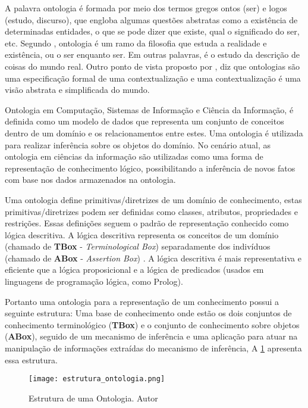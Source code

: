A palavra ontologia é formada por meio dos termos gregos ontos (ser) e logos (estudo, discurso), que engloba algumas questões abstratas como a existência de determinadas entidades, o que se pode dizer que existe, qual o significado do ser, etc. Segundo \citet{wolff1962philosophia}, ontologia é um ramo da filosofia que estuda a realidade e existência, ou o ser enquanto ser. Em outras palavras, é o estudo da descrição de coisas do mundo real. Outro ponto de vista proposto por \citet{gruber1993ontology}, diz que ontologias são uma especificação formal de uma contextualização e uma contextualização é uma visão abstrata e simplificada do mundo.

Ontologia em Computação, Sistemas de Informação e Ciência da Informação, é definida como um modelo de dados que representa um conjunto de conceitos dentro de um domínio e os relacionamentos entre estes. Uma ontologia é utilizada para realizar inferência sobre os objetos do domínio. No cenário atual, as ontologia em ciências da informação são utilizadas como uma forma de representação de conhecimento lógico, possibilitando a inferência de novos fatos com base nos dados armazenados na ontologia.

Uma ontologia define primitivas/diretrizes de um domínio de conhecimento, estas primitivas/diretrizes podem ser definidas como classes, atributos, propriedades e restrições. Essas definições seguem o padrão de representação conhecido como lógica descritiva. A lógica descritiva representa os conceitos de um domínio (chamado de \textbf{TBox} - \textit{Terminological Box}) separadamente dos indivíduos (chamado de \textbf{ABox} - \textit{Assertion Box}) \cite{calvanese2005dl}. A lógica descritiva é mais representativa e eficiente que a lógica proposicional e a lógica de predicados (usados em linguagens de programação lógica, como Prolog).

Portanto uma ontologia para a representação de um conhecimento possui a seguinte estrutura: Uma base de conhecimento onde estão os dois conjuntos de conhecimento terminológico (\textbf{TBox}) e o conjunto de conhecimento sobre objetos (\textbf{ABox}), seguido de um mecanismo de inferência e uma aplicação para atuar na manipulação de informações extraídas do mecanismo de inferência, A \ref{fig:estrct_onto} apresenta essa estrutura.

\begin{figure}[htb]
	\centering					
	{\texttt{[image: estrutura\_ontologia.png]}}
	
	\caption{Estrutura de uma Ontologia. Autor}
	\label{fig:estrct_onto}
\end{figure}

